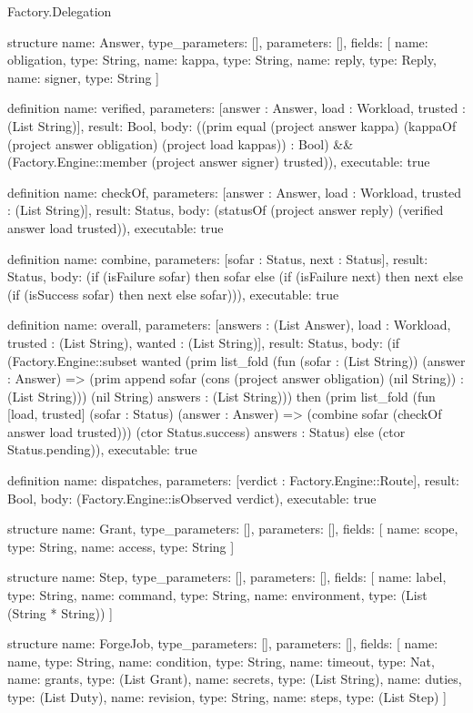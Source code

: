 \begin{lexlean}{Factory.Delegation}
\begin{semanticmodule}
structure{
  name: Answer,
  type_parameters: [],
  parameters: [],
  fields: [
    {name: obligation, type: String},
    {name: kappa, type: String},
    {name: reply, type: Reply},
    {name: signer, type: String}
  ]
}

definition{
  name: verified,
  parameters: [answer : Answer, load : Workload, trusted : (List String)],
  result: Bool,
  body: ((prim equal (project answer kappa) (kappaOf (project answer obligation) (project load kappas)) : Bool) && (Factory.Engine::member (project answer signer) trusted)),
  executable: true
}

definition{
  name: checkOf,
  parameters: [answer : Answer, load : Workload, trusted : (List String)],
  result: Status,
  body: (statusOf (project answer reply) (verified answer load trusted)),
  executable: true
}

definition{
  name: combine,
  parameters: [sofar : Status, next : Status],
  result: Status,
  body: (if (isFailure sofar) then sofar else (if (isFailure next) then next else (if (isSuccess sofar) then next else sofar))),
  executable: true
}

definition{
  name: overall,
  parameters: [answers : (List Answer), load : Workload, trusted : (List String), wanted : (List String)],
  result: Status,
  body: (if (Factory.Engine::subset wanted (prim list_fold (fun (sofar : (List String)) (answer : Answer) => (prim append sofar (cons (project answer obligation) (nil String)) : (List String))) (nil String) answers : (List String))) then (prim list_fold (fun [load, trusted] (sofar : Status) (answer : Answer) => (combine sofar (checkOf answer load trusted))) (ctor Status.success) answers : Status) else (ctor Status.pending)),
  executable: true
}

definition{
  name: dispatches,
  parameters: [verdict : Factory.Engine::Route],
  result: Bool,
  body: (Factory.Engine::isObserved verdict),
  executable: true
}

structure{
  name: Grant,
  type_parameters: [],
  parameters: [],
  fields: [
    {name: scope, type: String},
    {name: access, type: String}
  ]
}

structure{
  name: Step,
  type_parameters: [],
  parameters: [],
  fields: [
    {name: label, type: String},
    {name: command, type: String},
    {name: environment, type: (List (String * String))}
  ]
}

structure{
  name: ForgeJob,
  type_parameters: [],
  parameters: [],
  fields: [
    {name: name, type: String},
    {name: condition, type: String},
    {name: timeout, type: Nat},
    {name: grants, type: (List Grant)},
    {name: secrets, type: (List String)},
    {name: duties, type: (List Duty)},
    {name: revision, type: String},
    {name: steps, type: (List Step)}
  ]
}


\end{semanticmodule}
\end{lexlean}
